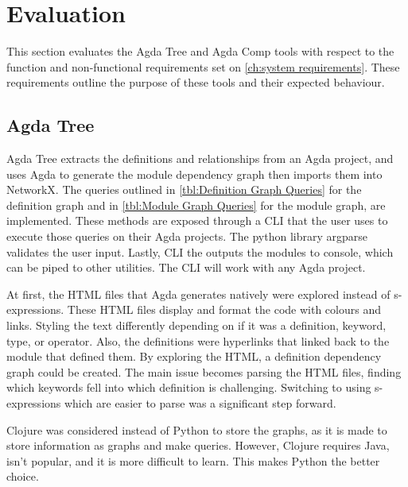 
\chapter{Evaluation}

This section evaluates the Agda Tree and Agda Comp tools with respect to the
function and non-functional requirements set on \cref{ch:system requirements}. These requirements outline the purpose of these tools and their
expected behaviour.

\section{Agda Tree} \label{sec:eval agda tree}

Agda Tree extracts the definitions and relationships from an Agda project, and
uses Agda to generate the module dependency graph then imports them into
NetworkX. The queries outlined in \cref{tbl:Definition Graph Queries} for the
definition graph and in \cref{tbl:Module Graph Queries} for the module graph,
are implemented. These methods are exposed through a CLI
that the user uses to execute those queries on their Agda projects. The python
library argparse validates the user input. Lastly, CLI the outputs the modules to
console, which can be piped to other utilities. The CLI will work
with any Agda project.

At first, the HTML files that Agda generates natively were explored instead of
s-expressions. These HTML files display and format the code with colours and
links. Styling the text differently depending on if it was a definition,
keyword, type, or operator. Also, the definitions were hyperlinks that linked
back to the module that defined them. By exploring the HTML, a definition
dependency graph could be created. The main issue becomes parsing the HTML
files, finding which keywords fell into which definition is challenging.
Switching to using s-expressions which are easier to parse was a significant
step forward.

Clojure was considered instead of Python to store the graphs, as it is made to
store information as graphs and make queries. However, Clojure requires Java,
isn't popular, and it is more difficult to learn. This makes Python the better
choice.

